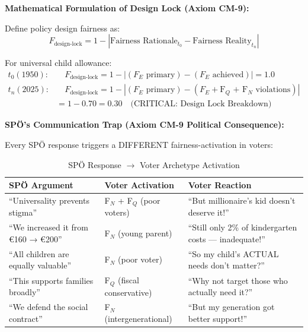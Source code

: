 \textbf{Mathematical Formulation of Design Lock (Axiom CM-9):}

Define policy design fairness as:
\begin{equation}
F_{\text{design-lock}} = 1 - |\text{Fairness Rationale}_{t_0} - \text{Fairness Reality}_{t_n}|
\end{equation}

For universal child allowance:
\begin{equation}
\begin{split}
t_0 (1950): & \quad F_{\text{design-lock}} = 1 - |(F_E \text{ primary}) - (F_E \text{ achieved})| = 1.0 \\
t_n (2025): & \quad F_{\text{design-lock}} = 1 - |(F_E \text{ primary}) - (F_E + \text{F$_Q$ + F$_N$ violations})| \\
& = 1 - 0.70 = 0.30 \quad \text{(CRITICAL: Design Lock Breakdown)}
\end{split}
\end{equation}

\textbf{SPÖ's Communication Trap (Axiom CM-9 Political Consequence):}

Every SPÖ response triggers a DIFFERENT fairness-activation in voters:

\begin{table}[htbp]
\centering
\caption{SPÖ Response $\rightarrow$ Voter Archetype Activation}
\label{tab:cm-designlock-trap}
\renewcommand{\arraystretch}{1.5}
\begin{tabular}{@{}p{3cm}p{4cm}p{4cm}@{}}
\toprule
\textbf{SPÖ Argument} & \textbf{Voter Activation} & \textbf{Voter Reaction} \\
\midrule
``Universality prevents stigma'' &
F$_N$ + F$_Q$ (poor voters) &
``But millionaire's kid doesn't deserve it!'' \\

``We increased it from €160 → €200'' &
F$_N$ (young parent) &
``Still only 2\% of kindergarten costs --- inadequate!'' \\

``All children are equally valuable'' &
F$_N$ (poor voter) &
``So my child's ACTUAL needs don't matter?'' \\

``This supports families broadly'' &
F$_Q$ (fiscal conservative) &
``Why not target those who actually need it?'' \\

``We defend the social contract'' &
F$_N$ (intergenerational) &
``But my generation got better support!'' \\

\bottomrule
\end{tabular}
\end{table}

